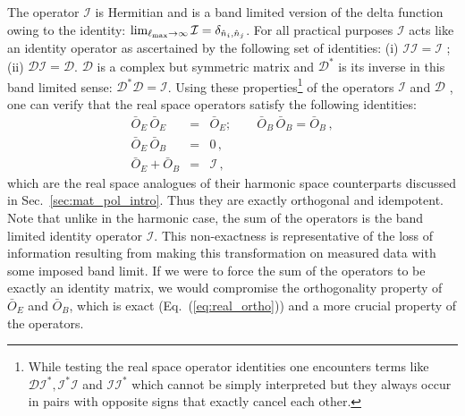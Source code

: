 \documentclass[a4paper,11pt]{article}
\newcommand{\beqry}{\begin{eqnarray}}
\newcommand{\eeqry}{\end{eqnarray}}
\def\eq#1{{Eq.~(\ref{#1})}}
\def\sec#1{{Sec.~\ref{#1}}}
\begin{document}
The operator $\mathcal{I}$ is Hermitian and is a band limited version of the delta function owing to the identity: $\lim_{\ell_{\rm max} \rightarrow \infty} \mathcal{I} = \delta_{\hat{n}_i, \hat{n}_j}$. For all practical purposes $\mathcal{I}$ acts like an identity operator as ascertained by the following set of identities: (i) $\mathcal{I} \mathcal{I}=\mathcal{I}$ ; (ii) $\mathcal{D} \mathcal{I}=\mathcal{D}$. $\mathcal{D}$ is a complex but symmetric matrix and $\mathcal{D}^*$ is its inverse in this band limited sense: $\mathcal{D}^* \mathcal{D}=\mathcal{I}$. Using these properties\footnote{While testing the real space operator identities one encounters terms like $\mathcal{D} \mathcal{I}^*,\mathcal{I}^*\mathcal{I}$ and $\mathcal{I}\mathcal{I}^*$ which cannot be simply interpreted but they always occur in pairs with opposite signs that exactly cancel each other.} of the operators $\mathcal{I}$ and $\mathcal{D}$ , one can verify that the real space operators satisfy the following identities:
%
\begin{subequations}
\beqry
\bar O_E \, \bar O_E &=& \bar O_E;\qquad \bar O_B \, \bar O_B = \bar O_B \,, \\
\bar O_E \, \bar O_B &=& 0 \,,\label{eq:real_ortho}\\
\bar O_E + \bar O_B &=& \mathcal{I} \,,
\eeqry
\end{subequations}
%
which are the real space analogues of their harmonic space counterparts discussed in \sec{sec:mat_pol_intro}. Thus they are exactly orthogonal and idempotent. Note that unlike in the harmonic case, the sum of the operators is the band limited identity operator $\mathcal{I}$. This non-exactness is representative of the loss of information resulting from making this transformation on measured data with some imposed band limit. If we were to force the sum of the operators to be exactly an identity matrix, we would compromise the orthogonality property of $\bar{O}_E$ and $\bar{O}_B$, which is exact (\eq{eq:real_ortho}) and a more crucial property of the operators.
%
\end{document}

